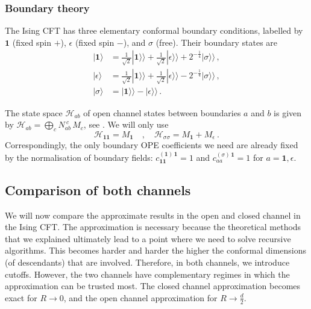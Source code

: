 \documentclass[11pt,a4paper]{article}
\numberwithin{equation}{section}
\def\ket#1{|{#1}\rangle}
\newcommand{\one}{\mathbf{1}} %
\begin{document}
\subsubsection*{Boundary theory}

The Ising CFT has three elementary conformal boundary conditions, labelled 
by $\one$ (fixed spin $+$), $\epsilon$ (fixed spin $-$), and $\sigma$ (free). Their boundary states are
\begin{align}
    \ket{\one} &= \frac{1}{\sqrt{2}} \ket{\one}\!\rangle +  \frac{1}{\sqrt{2}} \ket{\epsilon}\!\rangle + 2^{-\frac{1}{4}} \ket{\sigma}\!\rangle\,,
    \nonumber\\
    \ket{\epsilon} &= \frac{1}{\sqrt{2}} \ket{\one}\!\rangle +  \frac{1}{\sqrt{2}} \ket{\epsilon}\!\rangle - 2^{-\frac{1}{4}} \ket{\sigma}\!\rangle\,,
    \nonumber\\
    \ket{\sigma} &=  \ket{\one}\!\rangle -  \ket{\epsilon}\!\rangle\,.
\label{eq:Ising-bnd-state}
\end{align}


\noindent 
The state space $\mathcal{H}_{ab}$ of open channel states between boundaries $a$ and $b$ is given by $\mathcal{H}_{ab} = \bigoplus_{c}  N_{ab}^{~c}\, M_c$, see \cite{Cardy:1989ir}. We will only use
%
\begin{equation}\label{eq:Ising-openstates}
    \mathcal{H}_{\one\one} = M_{\one}
    \quad , \quad
    \mathcal{H}_{\sigma\sigma} = M_{\one} + M_{\epsilon} ~.
\end{equation}
Correspondingly, the only boundary OPE coefficients we need are already fixed by the normalisation of boundary fields: $c_{\one\one}^{(\one)\,\one} = 1$ and $c_{aa}^{(\sigma)\,\one} = 1$ for $a = \one, \epsilon$.


\subsection{Comparison of both channels}\label{sec:explicit_results_Ising}

We will now compare the approximate results in the open and closed channel in the Ising CFT. 
The approximation is necessary because the theoretical methods that we explained ultimately lead to a point where we need to solve recursive algorithms. This becomes harder and harder the higher the conformal dimensions (of descendants) that are involved. Therefore, in both channels, we introduce cutoffs.
However, the two channels have complementary regimes in which the approximation can be trusted most. The closed channel approximation becomes exact for $R\to 0$, and the open channel approximation for $R\to \frac{d}{2}$.
\end{document}
